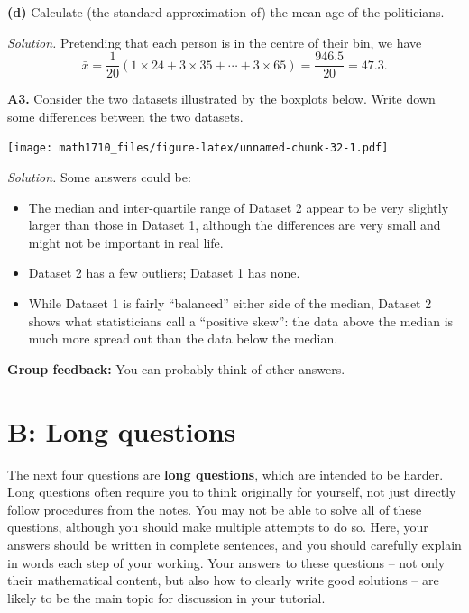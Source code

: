 \documentclass[
  a4paper,
]{book}
\providecommand{\tightlist}{%
  \setlength{\itemsep}{0pt}\setlength{\parskip}{0pt}}
\theoremstyle{definition}
\theoremstyle{definition}
\theoremstyle{definition}
\theoremstyle{definition}
\theoremstyle{remark}
\begin{document}
\textbf{(d)} Calculate (the standard approximation of) the mean age of the politicians.

\begin{myanswers}
\emph{Solution.} Pretending that each person is in the centre of their bin, we have
\[ \bar x = \frac{1}{20} (1\times24 + 3\times 35 + \cdots + 3 \times 65) = \frac{946.5}{20} = 47.3 . \]

\end{myanswers}

\textbf{A3.} Consider the two datasets illustrated by the boxplots below. Write down some differences between the two datasets.

\texttt{[image: math1710\_files/figure-latex/unnamed-chunk-32-1.pdf]}

\begin{myanswers}
\emph{Solution.} Some answers could be:

\begin{itemize}
\tightlist
\item
  The median and inter-quartile range of Dataset 2 appear to be very slightly larger than those in Dataset 1, although the differences are very small and might not be important in real life.
\item
  Dataset 2 has a few outliers; Dataset 1 has none.
\item
  While Dataset 1 is fairly ``balanced'' either side of the median, Dataset 2 shows what statisticians call a ``positive skew'': the data above the median is much more spread out than the data below the median.
\end{itemize}

\textbf{Group feedback:}
You can probably think of other answers.

\end{myanswers}

\hypertarget{P1-long}{%
\section*{B: Long questions}\label{P1-long}}

The next four questions are \textbf{long questions}, which are intended to be harder. Long questions often require you to think originally for yourself, not just directly follow procedures from the notes. You may not be able to solve all of these questions, although you should make multiple attempts to do so. Here, your answers should be written in complete sentences, and you should carefully explain in words each step of your working. Your answers to these questions -- not only their mathematical content, but also how to clearly write good solutions -- are likely to be the main topic for discussion in your tutorial.
\end{document}
